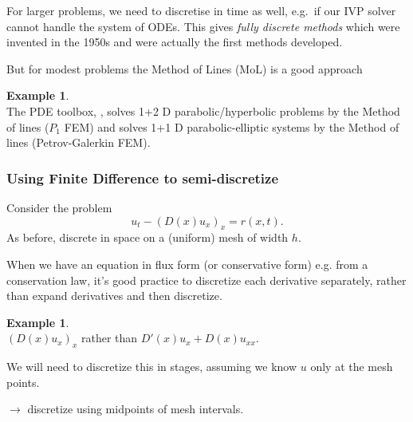 \documentclass[12pt, a4paper]{article}
\theoremstyle{definition}
\newtheorem{example}[thm]{Example}
\theoremstyle{remark}
\numberwithin{equation}{section}
\begin{document}
For larger problems, we need to discretise in time as well, e.g.\ if our IVP solver cannot handle the system of ODEs.
This gives \emph{fully discrete methods} which were invented in the 1950s and were actually the first methods developed. 

But for modest problems the Method of Lines (MoL) is a good approach 

\begin{example} \ \\
The PDE toolbox, , solves 1+2 D parabolic/hyperbolic problems by the Method of lines ($P_1$ FEM) and  solves 1+1 D parabolic-elliptic systems by the Method of lines (Petrov-Galerkin FEM).
\end{example}

\newpage
\subsubsection{Using Finite Difference to semi-discretize}

Consider the problem
\[  u_t - (D(x)u_x)_x = r(x,t).\]
As before, discrete in space on a (uniform) mesh of width $h$. 

\vspace{3cm}


When we have an equation in flux form (or conservative form) e.g. from a conservation law, it's good practice to discretize each derivative separately, 
rather than expand derivatives and then discretize. 

\begin{example} \ \\
$(D(x) u_x)_x$ rather than $D'(x) u_x + D(x) u_{xx}$.

We will need to discretize this in stages, assuming we know $u$ only at the mesh points.

$\to$ discretize using midpoints of mesh intervals.
\end{example}
\end{document}
